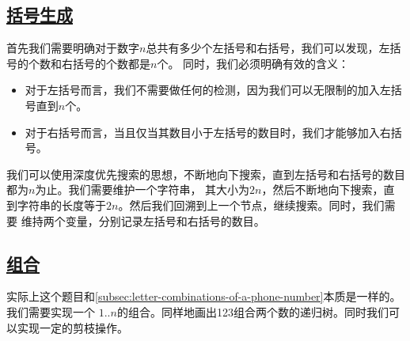 \documentclass[../../main.tex]{subfiles}
\begin{document}


\subsection{\href{https://leetcode.cn/problems/generate-parentheses/}{括号生成}}

首先我们需要明确对于数字$n$总共有多少个左括号和右括号，我们可以发现，左括号的个数和右括号的个数都是$n$个。
同时，我们必须明确有效的含义：

\begin{itemize}
  \item 对于左括号而言，我们不需要做任何的检测，因为我们可以无限制的加入左括号直到$n$个。
  \item 对于右括号而言，当且仅当其数目小于左括号的数目时，我们才能够加入右括号。
\end{itemize}

我们可以使用深度优先搜索的思想，不断地向下搜索，直到左括号和右括号的数目都为$n$为止。我们需要维护一个字符串，
其大小为$2n$，然后不断地向下搜索，直到字符串的长度等于$2n$。然后我们回溯到上一个节点，继续搜索。同时，我们需要
维持两个变量，分别记录左括号和右括号的数目。



\subsection{\href{https://leetcode.cn/problems/combinations/}{组合}}

实际上这个题目和\ref{subsec:letter-combinations-of-a-phone-number}本质是一样的。我们需要实现一个
$1..n$的组合。同样地画出123组合两个数的递归树。同时我们可以实现一定的剪枝操作。



\end{document}
